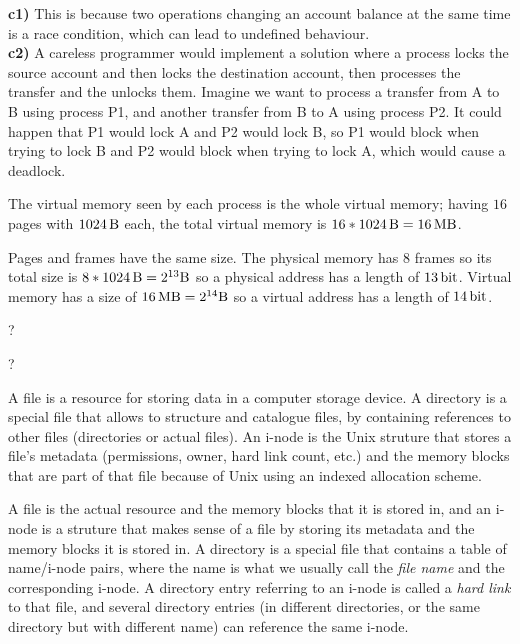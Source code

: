 \documentclass{sope}
\begin{document}

\textbf{c1)} This is because two operations changing an account balance at the same time is a race condition, which can lead to undefined behaviour.\\
\textbf{c2)} A careless programmer would implement a solution where a process locks the source account and then locks the destination account, then processes the transfer and the unlocks them. Imagine we want to process a transfer from A to B using process P1, and another transfer from B to A using process P2. It could happen that P1 would lock A and P2 would lock B, so P1 would block when trying to lock B and P2 would block when trying to lock A, which would cause a deadlock. 

The virtual memory seen by each process is the whole virtual memory; having $16$ pages with $\SI{1024}{\byte}$ each, the total virtual memory is $16*\SI{1024}{\byte} = \SI{16}{\mega\byte}$.

Pages and frames have the same size. The physical memory has 8 frames so its total size is $8*\SI{1024}{\byte}=2^{13}\SI{}{\byte}$ so a physical address has a length of $\SI{13}{\bit}$. Virtual memory has a size of $\SI{16}{\mega\byte}=2^{14}\SI{}{\byte}$ so a virtual address has a length of $\SI{14}{\bit}$.

?

?

A file is a resource for storing data in a computer storage device. A directory is a special file that allows to structure and catalogue files, by containing references to other files (directories or actual files). An i-node is the Unix struture that stores a file's metadata (permissions, owner, hard link count, etc.) and the memory blocks that are part of that file because of Unix using an indexed allocation scheme.

A file is the actual resource and the memory blocks that it is stored in, and an i-node is a struture that makes sense of a file by storing its metadata and the memory blocks it is stored in. A directory is a special file that contains a table of name/i-node pairs, where the name is what we usually call the \emph{file name} and the corresponding i-node. A directory entry referring to an i-node is called a \emph{hard link} to that file, and several directory entries (in different directories, or the same directory but with different name) can reference the same i-node.
\end{document}
